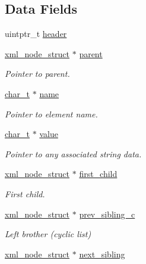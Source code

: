 \subsection*{Data Fields}
\begin{DoxyCompactItemize}
\item 
uintptr\-\_\-t \hyperlink{structpugi_1_1xml__node__struct_aea2e405a368dc5a278a2d23465f1975c}{header}
\item 
\hyperlink{structpugi_1_1xml__node__struct}{xml\-\_\-node\-\_\-struct} $\ast$ \hyperlink{structpugi_1_1xml__node__struct_af692c222bcc5a9f61108cb3ae0b7b5ea}{parent}
\begin{DoxyCompactList}\small\item\em Pointer to parent. \end{DoxyCompactList}\item 
\hyperlink{namespacepugi_aef5a7a62cba0507542220ea15afe39df}{char\-\_\-t} $\ast$ \hyperlink{structpugi_1_1xml__node__struct_ae2324fdbd1e307fb12007d1d0f957a0b}{name}
\begin{DoxyCompactList}\small\item\em Pointer to element name. \end{DoxyCompactList}\item 
\hyperlink{namespacepugi_aef5a7a62cba0507542220ea15afe39df}{char\-\_\-t} $\ast$ \hyperlink{structpugi_1_1xml__node__struct_a191e708864fccda17bb66157afdadd2d}{value}
\begin{DoxyCompactList}\small\item\em Pointer to any associated string data. \end{DoxyCompactList}\item 
\hyperlink{structpugi_1_1xml__node__struct}{xml\-\_\-node\-\_\-struct} $\ast$ \hyperlink{structpugi_1_1xml__node__struct_af72c49a0f81928ef664d9d2f0260f23d}{first\-\_\-child}
\begin{DoxyCompactList}\small\item\em First child. \end{DoxyCompactList}\item 
\hyperlink{structpugi_1_1xml__node__struct}{xml\-\_\-node\-\_\-struct} $\ast$ \hyperlink{structpugi_1_1xml__node__struct_a74e62128c88c422c0ed969633bbb2d4e}{prev\-\_\-sibling\-\_\-c}
\begin{DoxyCompactList}\small\item\em Left brother (cyclic list) \end{DoxyCompactList}\item 
\hyperlink{structpugi_1_1xml__node__struct}{xml\-\_\-node\-\_\-struct} $\ast$ \hyperlink{structpugi_1_1xml__node__struct_acf0867e3a77871e37132046d97398a6d}{next\-\_\-sibling}

\end{DoxyCompactItemize}
